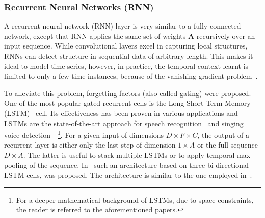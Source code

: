 \subsubsection{Recurrent Neural Networks (RNN)}%


A recurrent neural network (RNN) layer is very similar to a fully connected network, except that RNN applies the same set of weights \(\mathbf{A}\) recursively over an input sequence.
While convolutional layers excel in capturing local structures, RNNs can detect structure in sequential data of arbitrary length. %
This makes it ideal to model time series, however, in practice, the temporal context learnt is limited to only a few time instances, because of the vanishing gradient problem~\cite{Hochreiter98}.

To alleviate this problem, forgetting factors (also called gating) were proposed.
One of the most popular gated recurrent cells is the Long Short-Term Memory (LSTM)~\cite{Hochreiter97} cell.
Its effectiveness has been proven in various applications and LSTMs are the state-of-the-art approach for speech recognition~\cite{Graves13} and singing voice detection~\cite{Leglaive15}~\footnote{For a deeper mathematical background of LSTMs, due to space constraints, the reader is referred to the aforementioned papers.}.
For a given input of dimensions \(D \times F \times C\), the output of a recurrent layer is either only the last step of dimension \(1 \times A\) or the full sequence \(D \times A\).
The latter is useful to stack multiple LSTMs or to apply temporal max pooling of the sequence.
In~\cite{stoeter17} such an architecture based on three bi-directional LSTM cells, was proposed. The architecture is similar to the one employed in~\cite{Leglaive15}.

